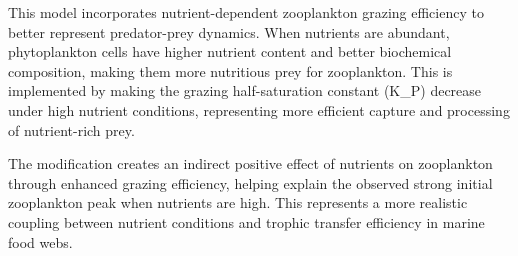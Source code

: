 This model incorporates nutrient-dependent zooplankton grazing efficiency to better represent predator-prey dynamics. When nutrients are abundant, phytoplankton cells have higher nutrient content and better biochemical composition, making them more nutritious prey for zooplankton. This is implemented by making the grazing half-saturation constant (K_P) decrease under high nutrient conditions, representing more efficient capture and processing of nutrient-rich prey.

The modification creates an indirect positive effect of nutrients on zooplankton through enhanced grazing efficiency, helping explain the observed strong initial zooplankton peak when nutrients are high. This represents a more realistic coupling between nutrient conditions and trophic transfer efficiency in marine food webs.
